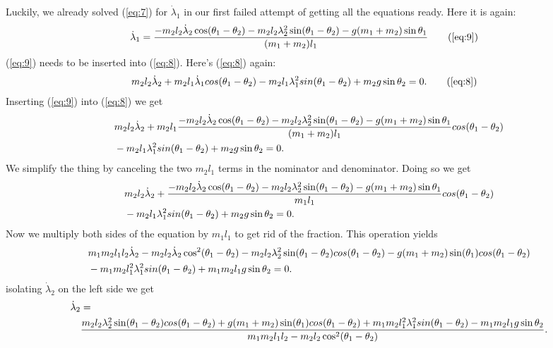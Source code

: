 \documentclass[paper=a4, fontsize=11pt]{scrartcl} %
\numberwithin{equation}{section} %
\numberwithin{figure}{section} %
\numberwithin{table}{section} %
\begin{document}
Luckily, we already solved (\ref{eq:7}) for $\dot{\lambda}_1$ in our first failed attempt of getting all the equations ready. Here it is again:
\begin{align} 
  \dot{\lambda}_1 &= \frac{- m_2 l_2 \dot{\lambda}_2 \cos(\theta_1 - \theta_2) - m_2 l_2 \lambda^2_2 \sin(\theta_1 - \theta_2) - g (m_1 + m_2) \sin \theta_1}{(m_1 + m_2) l_1} \tag{\ref{eq:9}}
\end{align}
(\ref{eq:9}) needs to be inserted into (\ref{eq:8}). Here's (\ref{eq:8}) again:
\begin{align} 
  m_2 l_2 \dot{\lambda}_2 + m_2 l_1 \dot{\lambda}_1 cos(\theta_1 - \theta_2)
  - m_2 l_1 \lambda^2_1 sin(\theta_1 - \theta_2) + m_2 g \sin \theta_2 &= 0. \tag{\ref{eq:8}}
\end{align}
Inserting (\ref{eq:9}) into (\ref{eq:8}) we get
\begin{align} 
  &m_2 l_2 \dot{\lambda}_2 + m_2 l_1 \frac{- m_2 l_2 \dot{\lambda}_2 \cos(\theta_1 - \theta_2) - m_2 l_2 \lambda^2_2 \sin(\theta_1 - \theta_2) - g (m_1 + m_2) \sin \theta_1}{(m_1 + m_2) l_1} cos(\theta_1 - \theta_2) \\ \notag
  &- m_2 l_1 \lambda^2_1 sin(\theta_1 - \theta_2) + m_2 g \sin \theta_2 = 0. \label{eq:18}
\end{align}
We simplify the thing by canceling the two $m_2 l_1$ terms in the nominator and denominator. Doing so we get
\begin{align} 
  &m_2 l_2 \dot{\lambda}_2 + \frac{- m_2 l_2 \dot{\lambda}_2 \cos(\theta_1 - \theta_2) - m_2 l_2 \lambda^2_2 \sin(\theta_1 - \theta_2) - g (m_1 + m_2) \sin \theta_1}{m_1l_1} cos(\theta_1 - \theta_2) \\ \notag
  &- m_2 l_1 \lambda^2_1 sin(\theta_1 - \theta_2) + m_2 g \sin \theta_2 = 0. \label{eq:19}
\end{align}
Now we multiply both sides of the equation by $m_1 l_1$ to get rid of the fraction. This operation yields
\begin{align} 
  &m_1 m_2 l_1 l_2 \dot{\lambda}_2 - m_2 l_2 \dot{\lambda}_2 \cos^2(\theta_1 - \theta_2) - m_2 l_2 \lambda^2_2 \sin(\theta_1 - \theta_2)cos(\theta_1 - \theta_2) - g (m_1 + m_2) \sin (\theta_1) cos(\theta_1 - \theta_2)  \\ \notag
  &- m_1 m_2 l^2_1 \lambda^2_1 sin(\theta_1 - \theta_2) + m_1 m_2 l_1 g \sin \theta_2 = 0. \label{eq:20}
\end{align}
isolating $\dot{\lambda}_2$ on the left side we get
\begin{align} 
  \dot{\lambda}_2  &= \\ \label{eq:21} 
   & \frac{m_2 l_2 \lambda^2_2 \sin(\theta_1 - \theta_2)cos(\theta_1 - \theta_2) + g (m_1 + m_2) \sin (\theta_1) cos(\theta_1 - \theta_2) + m_1 m_2 l^2_1 \lambda^2_1 sin(\theta_1 - \theta_2) - m_1 m_2 l_1 g \sin \theta_2}{m_1 m_2 l_1 l_2  - m_2 l_2 \cos^2(\theta_1 - \theta_2)}. \notag
\end{align}
\end{document}
